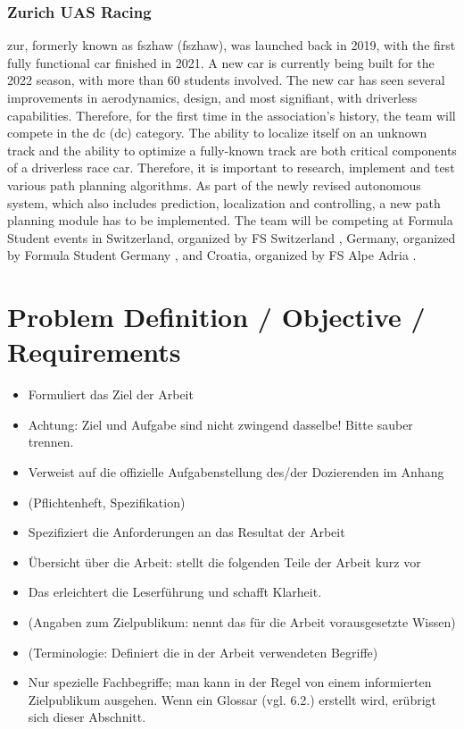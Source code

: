 \subsubsection{Zurich UAS Racing}
\acrlong{zur}, formerly known as \acrlong{fszhaw} (\acrshort{fszhaw}), was launched back in 2019, with the first fully functional car finished in 2021. A new car is currently being built for the 2022 season, with more than 60 students involved. The new car has seen several improvements in aerodynamics, design, and most signifiant, with driverless capabilities. \cite{fszhaw_launch}
Therefore, for the first time in the association's history, the team will compete in the \acrlong{dc} (\acrshort{dc}) category.
The ability to localize itself on an unknown track and the ability to optimize a fully-known track are both critical components of a driverless race car. Therefore, it is important to research, implement and test various path planning algorithms. As part of the newly revised autonomous system, which also includes prediction, localization and controlling, a new path planning module has to be implemented.
The team will be competing at Formula Student events in Switzerland, organized by FS Switzerland \cite{fsswitzerland}, Germany, organized by Formula Student Germany \cite{fs_germany}, and Croatia, organized by FS Alpe Adria \cite{fs_alpe_adria}.

\section{Problem Definition / Objective / Requirements}
\begin{itemize}
    \item Formuliert das Ziel der Arbeit
    \item Achtung: Ziel und Aufgabe sind nicht zwingend dasselbe! Bitte sauber trennen.
    \item Verweist auf die offizielle Aufgabenstellung des/der Dozierenden im Anhang
    \item (Pflichtenheft, Spezifikation)
    \item Spezifiziert die Anforderungen an das Resultat der Arbeit
    \item Übersicht über die Arbeit: stellt die folgenden Teile der Arbeit kurz vor
    \item Das erleichtert die Leserführung und schafft Klarheit.
    \item (Angaben zum Zielpublikum: nennt das für die Arbeit vorausgesetzte Wissen)
    \item (Terminologie: Definiert die in der Arbeit verwendeten Begriffe)
    \item Nur spezielle Fachbegriffe; man kann in der Regel von einem informierten Zielpublikum ausgehen.
    Wenn ein Glossar (vgl. 6.2.) erstellt wird, erübrigt sich dieser Abschnitt.
\end{itemize}

